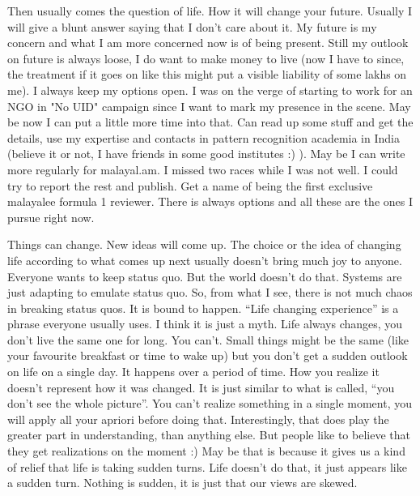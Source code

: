 Then usually comes the question of life. How it will change your future. Usually I will give a 
blunt answer saying that I don't care about it. My future is my concern and what I am more concerned now 
is of being present. Still my outlook on future is always loose, I do want to make money to live (now 
I have to since, the treatment if it goes on like this might put a visible liability of some lakhs 
on me). I always keep my options open. I was on the verge of starting to work for an NGO in "No UID" campaign 
since I want to mark my presence in the scene. May be now I can put a little more time into that. Can 
read up some stuff and get the details, use my expertise and contacts in pattern recognition academia in India
(believe it or not, I have friends in some good institutes :) ). May be I can write more regularly 
for malayal.am. I missed two races while I was not well. I could try to report the rest and publish. 
Get a name of being the first exclusive malayalee formula 1 reviewer. There is always options and 
all these are the ones I pursue right now. 

Things can change. New ideas will come up. The choice or the idea of changing life according to 
what comes up next usually doesn't bring much joy to anyone. Everyone wants to keep status quo. 
But the world doesn't do that. Systems are just adapting to emulate status quo. So, from what I see, 
there is not much chaos in breaking status quos. It is bound to happen. ``Life changing experience'' is 
a phrase everyone usually uses. I think it is just a myth. Life always changes, you don't live the same 
one for long. You can't. Small things might be the same (like your favourite breakfast or time to wake up) 
but you don't get a sudden outlook on life on a single day. It happens over a period of time. How you
realize it doesn't represent how it was changed. It is just similar to what is called, ``you don't see 
the whole picture''. You can't realize something in a single moment, you will apply all your apriori 
before doing that. Interestingly, that does play the greater part in understanding, than anything 
else. But people like to believe that they get realizations on the moment :) May be that is because it gives us a kind 
of relief that life is taking sudden turns. Life doesn't do that, it just appears like a sudden turn. 
Nothing is sudden, it is just that our views are skewed.

\newpage 
